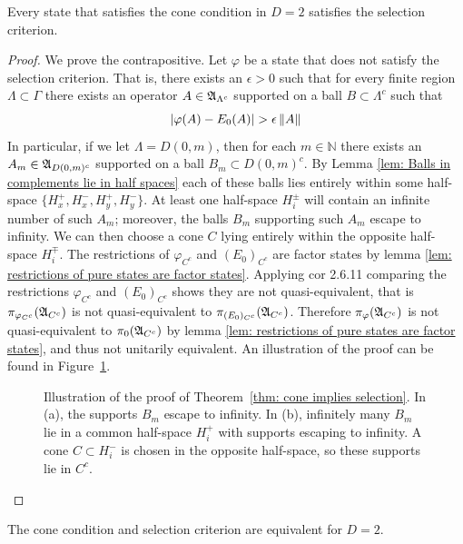 \documentclass[11pt]{amsart}
\begin{document}
\begin{thm}\label{thm: cone implies selection}
    Every state that satisfies the cone condition in $D=2$ satisfies the selection criterion. 
    \begin{proof}
        We prove the contrapositive. Let $\varphi$ be a state that does not satisfy the selection criterion. That is, there exists an $\epsilon>0$ such that for every finite region $\Lambda\subset \Gamma$ there exists an operator $A\in\mathfrak{A}_{\Lambda^c}$ supported on a ball $B\subset\Lambda^c$ such that
        \[
            |\varphi(A)-E_0(A)|>\epsilon\norm{A}
        \]
        In particular, if we let $\Lambda= D(0,m)$, then for each $m\in\mathbb{N}$ there exists an $A_m\in\mathfrak{A}_{D(0,m)^c}$ supported on a ball  $B_m\subset D(0,m)^c$. By Lemma \ref{lem: Balls in complements lie in half spaces} each of these balls lies entirely within some half-space $\{H_x^+,H_x^-,H_y^+,H_y^- \}$. At least one half-space $H_i^\pm$ will contain an infinite number of such $A_m$; moreover, the balls $B_m$ supporting such $A_m$ escape to infinity.  We can then choose a cone $C$ lying entirely within the opposite half-space $H_i^{\mp}$. The restrictions of $\varphi_{C^c}$ and $(E_0)_{C^c}$ are factor states by lemma \ref{lem: restrictions of pure states are factor states}. Applying \cite{bratteli_1987} cor 2.6.11 comparing the restrictions $\varphi_{C^c}$ and $(E_0)_{C^c}$ shows they are not quasi-equivalent, that is $\pi_{\varphi_{C^c}}(\mathfrak{A}_{C^c})$ is not quasi-equivalent to $\pi_{(E_0)_{C^c}}(\mathfrak{A}_{C^c})$. Therefore $\pi_{\varphi}(\mathfrak{A}_{C^c})$ is not quasi-equivalent to $\pi_{0}(\mathfrak{A}_{C^c})$ by lemma \ref{lem: restrictions of pure states are factor states}, and thus not unitarily equivalent. An illustration of the proof can be found in Figure~\ref{fig:theorem-5-5}.
        \begin{figure}[htpb]
            \centering
            \resizebox{\textwidth}{!}{%
                }
                \caption{
                Illustration of the proof of Theorem~\ref{thm: cone implies selection}.
                In (a), the supports $B_m$ escape to infinity.
                In (b), infinitely many $B_m$
                lie in a common half-space $H_i^+$ with supports escaping to
                infinity. A cone $C\subset H_i^-$ is chosen in the opposite
                half-space, so these supports lie in $C^c$.}
            \label{fig:theorem-5-5}
        \end{figure}
    \end{proof}
\end{thm}
\begin{cor}
    The cone condition and selection criterion are equivalent for $D=2$.
\end{cor}
\FloatBarrier
\end{document}
